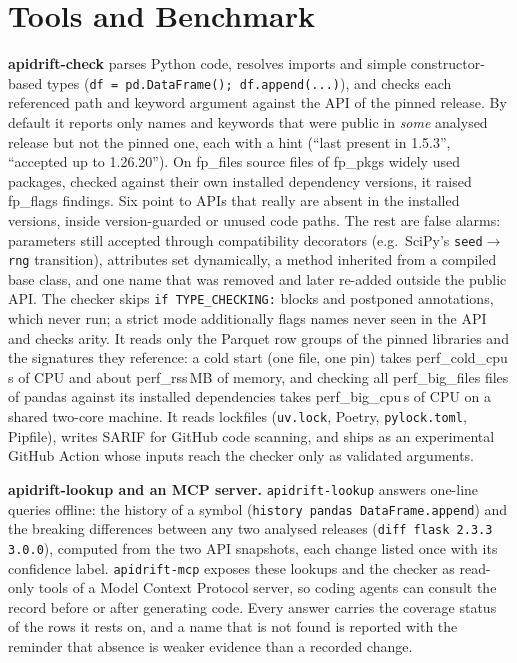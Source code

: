 \documentclass[10pt,twocolumn,letterpaper]{article}
\begin{document}
\section{Tools and Benchmark}\label{sec:tools}
\textbf{apidrift-check} parses Python code, resolves imports and simple constructor-based types
(\texttt{df = pd.DataFrame(); df.append(...)}), and checks each referenced path and keyword argument against the
API of the pinned release. By default it reports only names and keywords that were public in \emph{some}
analysed release but not the pinned one, each with a hint (``last present in 1.5.3'', ``accepted up to
1.26.20''). On {{fp_files}} source files of {{fp_pkgs}} widely used packages, checked against their own installed
dependency versions, it raised {{fp_flags}} findings. Six point to APIs that really are absent in the installed
versions, inside version-guarded or unused code paths. The rest are false alarms: parameters still accepted
through compatibility decorators (e.g.\ SciPy's \texttt{seed}$\to$\texttt{rng} transition), attributes set
dynamically, a method inherited from a compiled base class, and one name that was removed and later re-added outside
the public API. The checker skips \texttt{if TYPE\_CHECKING:} blocks and postponed annotations, which never run; a
strict mode additionally flags names never seen in the API and checks arity. It reads only the Parquet row groups of
the pinned libraries and the signatures they reference: a cold start (one file, one pin) takes {{perf_cold_cpu}}\,s of
CPU and about {{perf_rss}}\,MB of memory, and checking all {{perf_big_files}} files of pandas against its installed
dependencies takes {{perf_big_cpu}}\,s of CPU on a shared two-core machine. It reads lockfiles (\texttt{uv.lock},
Poetry, \texttt{pylock.toml}, Pipfile), writes SARIF for GitHub code scanning, and ships as an experimental GitHub
Action whose inputs reach the checker only as validated arguments.

\textbf{apidrift-lookup and an MCP server.} \texttt{apidrift-lookup} answers one-line queries offline: the history
of a symbol (\texttt{history pandas DataFrame.append}) and the breaking differences between any two analysed releases
(\texttt{diff flask 2.3.3 3.0.0}), computed from the two API snapshots, each change listed once with its confidence
label. \texttt{apidrift-mcp} exposes these lookups and the checker as read-only tools of a Model Context Protocol
server, so coding agents can consult the record before or after generating code. Every answer carries the coverage
status of the rows it rests on, and a name that is not found is reported with the reminder that absence is weaker
evidence than a recorded change.
\end{document}
